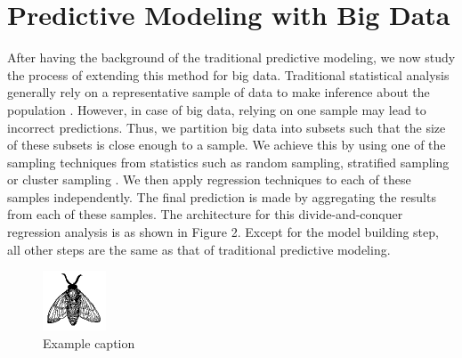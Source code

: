 \documentclass[sigconf]{acmart}
\begin{document}
\section{Predictive Modeling with Big Data}

After having the background of the traditional predictive modeling, we now study the process of extending this method for big data. Traditional statistical analysis generally rely on a representative sample of data to make inference about the population \cite{part-reg}. However, in case of big data, relying on one sample may lead to incorrect predictions. Thus, we partition big data into subsets such that the size of these subsets is close enough to a sample. We achieve this by using one of the sampling techniques from statistics such as random sampling, stratified sampling or cluster sampling \cite{div-reg}. We then apply regression techniques to each of these samples independently. The final prediction is made by aggregating the results from each of these samples. The architecture for this divide-and-conquer regression analysis is as shown in Figure 2. Except for the model building step, all other steps are the same as that of traditional predictive modeling.

\begin{figure}[!ht]
  \centering\includegraphics[width=\columnwidth]{images/fly.pdf}
  \caption{Example caption}\label{f:fly}
\end{figure}
\end{document}
